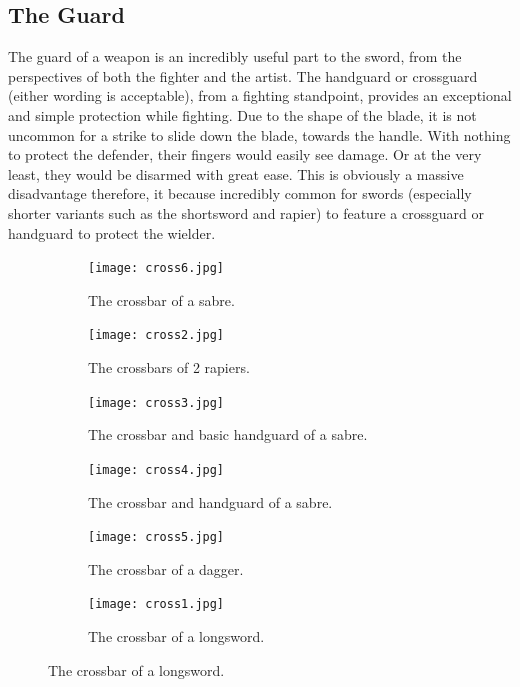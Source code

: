 \documentclass{article}
\begin{document}
\subsection{The Guard}
The guard of a weapon is an incredibly useful part to the sword, from the perspectives of both the fighter and the artist. The handguard or crossguard (either wording is acceptable), from a fighting standpoint, provides an exceptional and simple protection while fighting. Due to the shape of the blade, it is not uncommon for a strike to slide down the blade, towards the handle. With nothing to protect the defender, their fingers would easily see damage. Or at the very least, they would be disarmed with great ease. This is obviously a massive disadvantage therefore, it because incredibly common for swords (especially shorter variants such as the shortsword and rapier) to feature a crossguard or handguard to protect the wielder.

\begin{figure}[H]
    \centering
    \caption{A collection of crossguards from various blades}
    \label{fig:Crossguards}
    \begin{subfigure}{0.3\textwidth}
        \centering
        \texttt{[image: cross6.jpg]}
        \caption{The crossbar of a sabre.}
        \label{fig:Cross1}
    \end{subfigure}
        \begin{subfigure}{0.3\textwidth}
        \centering
        \texttt{[image: cross2.jpg]}
        \caption{The crossbars of 2 rapiers.}
        \label{fig:Cross2}
    \end{subfigure}
        \begin{subfigure}{0.3\textwidth}
        \centering
        \texttt{[image: cross3.jpg]}
        \caption{The crossbar and basic handguard of a sabre.}
        \label{fig:Cross3}
    \end{subfigure}
        \begin{subfigure}{0.3\textwidth}
        \centering
        \texttt{[image: cross4.jpg]}
        \caption{The crossbar and handguard of a sabre.}
        \label{fig:Cross4}
    \end{subfigure}
        \begin{subfigure}{0.3\textwidth}
        \centering
        \texttt{[image: cross5.jpg]}
        \caption{The crossbar of a dagger.}
        \label{fig:Cross5}
    \end{subfigure}
        \begin{subfigure}{0.3\textwidth}
        \centering
        \texttt{[image: cross1.jpg]}
        \caption{The crossbar of a longsword.}
        \label{fig:Cross6}
    \end{subfigure}
\end{figure}
\end{document}
